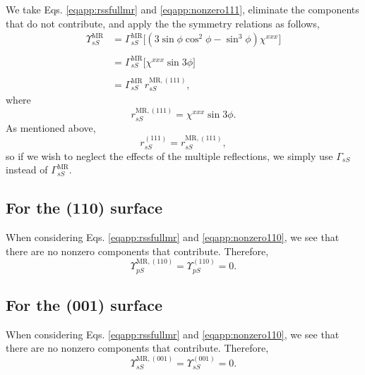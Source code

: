 We take Eqs. \eqref{eqapp:rssfullmr} and \eqref{eqapp:nonzero111}, eliminate the
components that do not contribute, and apply the the symmetry relations as
follows,
\begin{equation*}
\begin{split}
\Upsilon^{\mathrm{MR}}_{sS} &= 
\Gamma^{\mathrm{MR}}_{sS}
\big[
(3\sin\phi\cos^{2}\phi - \sin^{3}\phi)\chi^{xxx}
\big]\\\\
&= 
\Gamma^{\mathrm{MR}}_{sS}
\big[
\chi^{xxx}\sin3\phi
\big]\\\\
&= \Gamma^{\mathrm{MR}}_{sS}\,r^{\mathrm{MR},(111)}_{sS},
\end{split}
\end{equation*}
where
\begin{equation}\label{eqapp:final-rss.mr.111}
r^{\mathrm{MR},(111)}_{sS} = \chi^{xxx}\sin3\phi.
\end{equation}
As mentioned above,
\begin{equation}\label{eqapp:final-rss.111}
r^{(111)}_{sS} = r^{\mathrm{MR},(111)}_{sS},
\end{equation}
so if we wish to neglect the effects of the multiple reflections, we simply use
$\Gamma_{sS}$ instead of $\Gamma^{\mathrm{MR}}_{sS}$.


\subsection{For the (110) surface}

When considering Eqs. \eqref{eqapp:rssfullmr} and \eqref{eqapp:nonzero110}, we see
that there are no nonzero components that contribute. Therefore,
\begin{equation}\label{eqapp:final-rss.mr.110}
\Upsilon^{\mathrm{MR},(110)}_{pS} = \Upsilon^{(110)}_{pS} = 0.
\end{equation}


\subsection{For the (001) surface}

When considering Eqs. \eqref{eqapp:rssfullmr} and \eqref{eqapp:nonzero110}, we see
that there are no nonzero components that contribute. Therefore,
\begin{equation}\label{eqapp:final-rss.mr.001}
\Upsilon^{\mathrm{MR},(001)}_{sS} = \Upsilon^{(001)}_{sS} = 0.
\end{equation}


\stopcontents[chapters]
